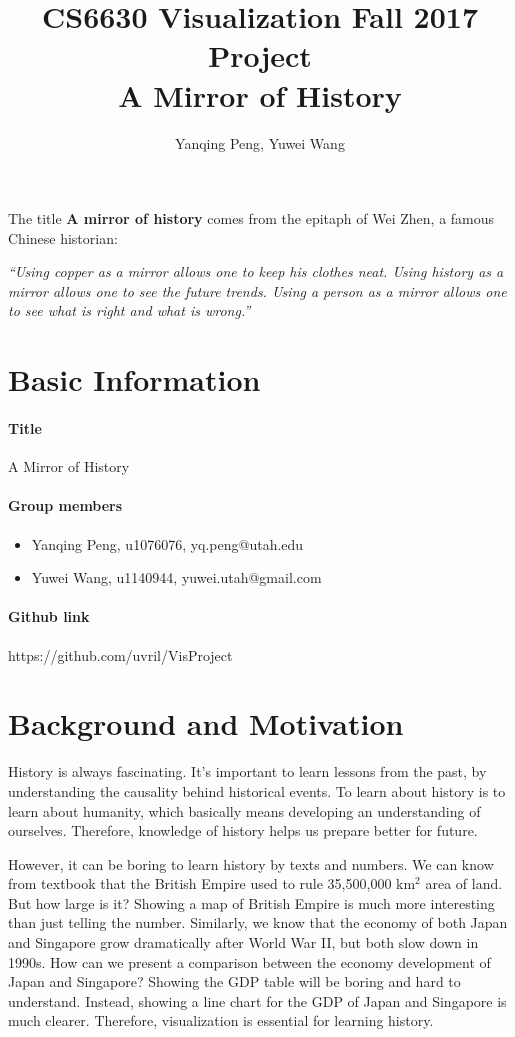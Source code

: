 \documentclass[12pt, fullpage,letterpaper]{article}
\title{CS6630 Visualization Fall 2017 Project \\ A Mirror of History}
\author{Yanqing Peng, Yuwei Wang}
\begin{document}
\maketitle
The title \textbf{A mirror of history} comes from the epitaph of Wei Zhen,
a famous Chinese historian:

\emph{``Using copper as a mirror allows one to keep his clothes neat. Using
history as a mirror allows one to see the future trends. Using a person as a
mirror allows one to see what is right and what is wrong.''}

\section{Basic Information}
\paragraph{Title} A Mirror of History
\paragraph{Group members}
\begin{itemize}
    \item Yanqing Peng, u1076076, yq.peng@utah.edu
    \item Yuwei Wang, u1140944, yuwei.utah@gmail.com
\end{itemize}
\paragraph{Github link} https://github.com/uvril/VisProject

\section{Background and Motivation}

History is always fascinating.  It's important to learn lessons from the past,
by understanding the causality behind historical events.  To learn about
history is to learn about humanity, which basically means developing an
understanding of ourselves.  Therefore, knowledge of history helps us prepare
better for future.

However, it can be boring to learn history by texts and numbers. We can know
from textbook that the British Empire used to rule 35,500,000 km$^2$ area of
land. But how large is it?  Showing a map of British Empire is much more
interesting than just telling the number.  Similarly, we know that the economy
of both Japan and Singapore grow dramatically after World War II, but both slow
down in 1990s.  How can we present a comparison between the economy development
of Japan and Singapore?  Showing the GDP table will be boring and hard to
understand.  Instead, showing a line chart for the GDP of Japan and Singapore
is much clearer. Therefore, visualization is essential for learning history.
\end{document}
